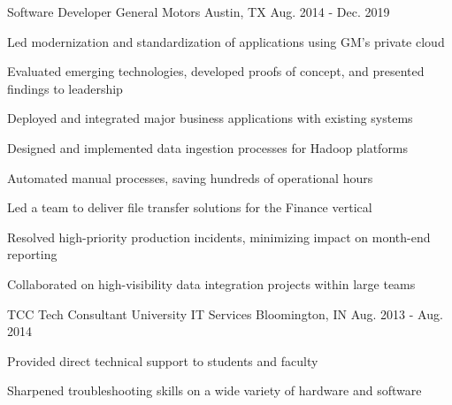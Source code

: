 \begin{cventries}
  \cventry
    {Software Developer}
    {General Motors}
    {Austin, TX}
    {Aug. 2014 - Dec. 2019}
    {
      \begin{cvitems}
        \item {Led modernization and standardization of applications using GM's private cloud}
        \item {Evaluated emerging technologies, developed proofs of concept, and presented findings to leadership}
        \item {Deployed and integrated major business applications with existing systems}
        \item {Designed and implemented data ingestion processes for Hadoop platforms}
        \item {Automated manual processes, saving hundreds of operational hours}
        \item {Led a team to deliver file transfer solutions for the Finance vertical}
        \item {Resolved high-priority production incidents, minimizing impact on month-end reporting}
        \item {Collaborated on high-visibility data integration projects within large teams}
      \end{cvitems}
    }
  \cventry
    {TCC Tech Consultant}
    {University IT Services}
    {Bloomington, IN}
    {Aug. 2013 - Aug. 2014}
    {
      \begin{cvitems} %
        \item {Provided direct technical support to students and faculty}
        \item {Sharpened troubleshooting skills on a wide variety of hardware and software}
      \end{cvitems}
    }

\end{cventries}
